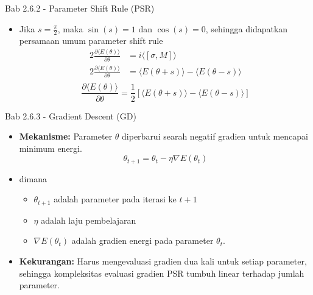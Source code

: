 \begin{frame}{Bab 2.6.2 - Parameter Shift Rule (PSR)}
    \begin{itemize}
        \item Jika $s = \frac{\pi}{2}$, maka $\sin(s) = 1$ dan $\cos(s) = 0$, sehingga didapatkan persamaan umum parameter shift rule
        \begin{equation*}
            \begin{split}
                2 \frac{\partial \langle E(\theta)\rangle}{\partial \theta} &= i \langle [\sigma, M]\rangle \\
                2 \frac{\partial \langle E(\theta)\rangle}{\partial \theta} &= \langle E(\theta+s)\rangle - \langle E(\theta-s)\rangle \\
            \end{split}
        \end{equation*}
        \begin{equation}
            \frac{\partial \langle E(\theta)\rangle}{\partial \theta} = \frac{1}{2} \left[ \langle E(\theta+s)\rangle - \langle E(\theta-s)\rangle \right]
        \end{equation}
    \end{itemize}
\end{frame}

\begin{frame}{Bab 2.6.3 - Gradient Descent (GD)}
    \begin{itemize}
        \item \textbf{Mekanisme:} Parameter $\theta$ diperbarui searah negatif gradien untuk mencapai minimum energi.
        \begin{equation*}
            \theta_{t+1} = \theta_t - \eta \nabla E(\theta_t)
        \end{equation*}
        \item dimana 
        \begin{itemize}
            \item $\theta_{t+1}$ adalah parameter pada iterasi ke $t+1$
            \item $\eta$ adalah laju pembelajaran 
            \item $\nabla E(\theta_t)$ adalah gradien energi pada parameter $\theta_t$.
        \end{itemize}
        \item \textbf{Kekurangan:} Harus mengevaluasi gradien dua kali untuk setiap parameter, sehingga kompleksitas evaluasi gradien PSR tumbuh linear terhadap jumlah parameter.
    \end{itemize}
\end{frame}

